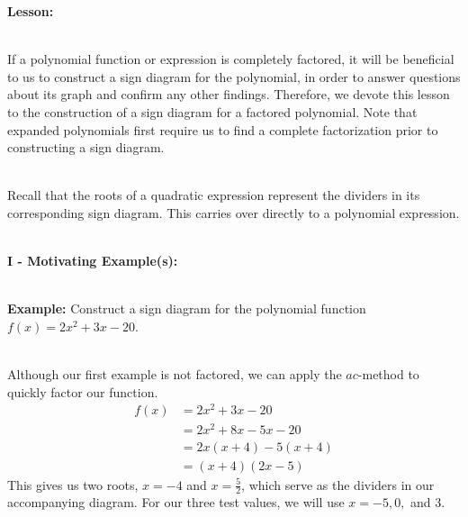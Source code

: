 \documentclass[12pt]{article}
\theoremstyle{definition}
\begin{document}
{\bf Lesson:}\\
\ \par
If a polynomial function or expression is completely factored, it will be beneficial to us to construct a sign diagram for the polynomial, in order to answer questions about its graph and confirm any other findings.  Therefore, we devote this lesson to the construction of a sign diagram for a factored polynomial.  Note that expanded polynomials first require us to find a complete factorization prior to constructing a sign diagram.\\
\ \par
Recall that the roots of a quadratic expression represent the dividers in its corresponding sign diagram.  This carries over directly to a polynomial expression.\\
\ \par
{\bf I - Motivating Example(s):}\\
\ \par
{\bf Example:} Construct a sign diagram for the polynomial function $f(x)=2x^2+3x-20$.\\
\ \par
Although our first example is not factored, we can apply the $ac$-method to quickly factor our function.
\begin{equation*}
\begin{split}
f(x) & = 2x^2+3x-20\\
& = 2x^2+8x-5x-20\\
& = 2x(x+4)-5(x+4)\\
& = (x+4)(2x-5)
\end{split}
\end{equation*}
This gives us two roots, $x=-4$ and $x=\frac{5}{2}$, which serve as the dividers in our accompanying diagram.  For our three test values, we will use $x=-5, 0,$ and $3$.
\begin{center}
\end{center}
\end{document}
